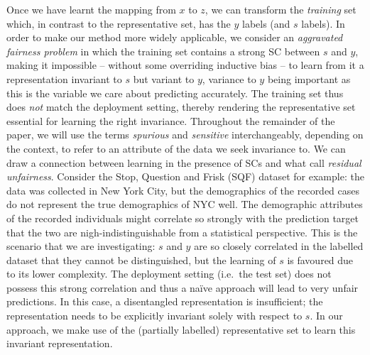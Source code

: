 Once we have learnt the mapping from $x$ to $z$, we can transform the \emph{training} set
which, in contrast to the representative set, has the $y$ labels (and $s$ labels). 
%
In order to make our method more widely applicable, we consider an \emph{aggravated fairness
problem} in which the training set contains a strong \acf{SC} between $s$ and $y$, making it
impossible -- without some overriding inductive bias -- to learn from it a representation invariant
to $s$ but variant to $y$, variance to $y$ being important as this is the variable we care about
predicting accurately. 
%
The training set thus does \emph{not} match the deployment setting, thereby rendering the
representative set essential for learning the right invariance.
Throughout the remainder of the paper, we will use the terms \emph{spurious} and \emph{sensitive}
interchangeably, depending on the context, to refer to an attribute of the data we seek invariance
to.
We can draw a connection between learning in the presence of \acp{SC} and what
\citet{kallus2018residual} call \emph{residual unfairness}. 
%
Consider the Stop, Question and Frisk (SQF) dataset for example: the data was collected in New York
City, but the demographics of the recorded cases do not represent the true demographics of NYC
well. 
%
The demographic attributes of the recorded individuals might correlate so strongly with the
prediction target that the two are nigh-indistinguishable from a statistical perspective. 
%
This is the scenario that we are investigating: $s$ and $y$ are so closely correlated in the
labelled dataset that they cannot be distinguished, but the learning of
$s$ is favoured due to its lower complexity.
%
The deployment setting (i.e.\ the test set) does not possess this strong correlation and thus a
na\"ive approach will lead to very unfair predictions. 
%
In this case, a disentangled representation is insufficient; the representation needs to be
explicitly invariant solely with respect to $s$. 
%
In our approach, we make use of the (partially labelled) representative set to learn this invariant
representation.

